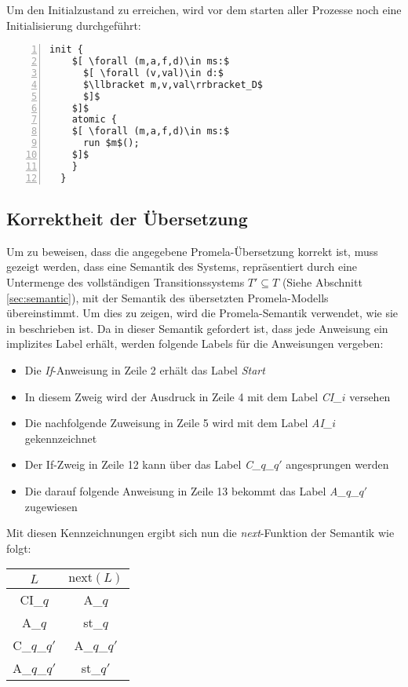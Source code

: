 Um den Initialzustand zu erreichen, wird vor dem starten aller Prozesse noch eine Initialisierung durchgeführt:
\begin{lstlisting}[language=Promela,mathescape=true,numbers=left,numberstyle=\small]
  init {
    $[ \forall (m,a,f,d)\in ms:$
      $[ \forall (v,val)\in d:$
      $\llbracket m,v,val\rrbracket_D$
      $]$
    $]$
    atomic {
    $[ \forall (m,a,f,d)\in ms:$
      run $m$();
    $]$
    }
  }
\end{lstlisting}

\subsection{Korrektheit der Übersetzung}
Um zu beweisen, dass die angegebene Promela-Übersetzung korrekt ist, muss gezeigt werden, dass eine Semantik des Systems, repräsentiert durch eine Untermenge des vollständigen Transitionssystems $T'\subseteq T$ (Siehe Abschnitt \ref{sec:semantic}), mit der Semantik des übersetzten Promela-Modells übereinstimmt.
Um dies zu zeigen, wird die Promela-Semantik verwendet, wie sie in \cite{Gallardo04formalaspects} beschrieben ist.
Da in dieser Semantik gefordert ist, dass jede Anweisung ein implizites Label erhält, werden folgende Labels für die Anweisungen vergeben:
\begin{itemize}
\item Die \emph{If}-Anweisung in Zeile 2 erhält das Label \emph{Start}
\item In diesem Zweig wird der Ausdruck in Zeile 4 mit dem Label \emph{CI\_$i$} versehen
\item Die nachfolgende Zuweisung in Zeile 5 wird mit dem Label \emph{AI\_$i$} gekennzeichnet
\item Der If-Zweig in Zeile 12 kann über das Label \emph{C\_$q$\_$q'$} angesprungen werden
\item Die darauf folgende Anweisung in Zeile 13 bekommt das Label \emph{A\_$q$\_$q'$} zugewiesen
\end{itemize}

Mit diesen Kennzeichnungen ergibt sich nun die \emph{next}-Funktion der Semantik wie folgt:

\begin{tabular}{|c|c|}
  \hline
  $L$ & $\textrm{next}(L)$\\
  \hline
  CI\_$q$ & A\_$q$\\
  A\_$q$ & st\_$q$\\
  C\_$q$\_$q'$ & A\_$q$\_$q'$\\
  A\_$q$\_$q'$ & st\_$q'$\\
  \hline
\end{tabular}

